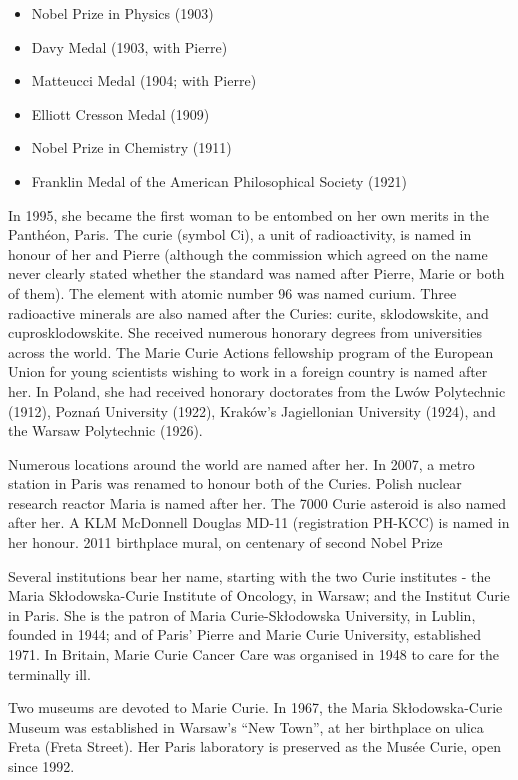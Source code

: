 \documentclass[12pt,a4paper]{article}
\begin{document}
\begin{itemize}
\item{Nobel Prize in Physics (1903)}
\item{Davy Medal (1903, with Pierre)}
\item{Matteucci Medal (1904; with Pierre)}
\item{Elliott Cresson Medal (1909)}
\item{Nobel Prize in Chemistry (1911)}
\item{Franklin Medal of the American Philosophical Society (1921)}
\end{itemize}

In 1995, she became the first woman to be entombed on her own merits in the Panth\'eon, Paris. The curie (symbol Ci), a unit of radioactivity, is named in honour of her and Pierre (although the commission which agreed on the name never clearly stated whether the standard was named after Pierre, Marie or both of them). The element with atomic number 96 was named curium. Three radioactive minerals are also named after the Curies: curite, sklodowskite, and cuprosklodowskite. She received numerous honorary degrees from universities across the world. The Marie Curie Actions fellowship program of the European Union for young scientists wishing to work in a foreign country is named after her. In Poland, she had received honorary doctorates from the Lw\'ow Polytechnic (1912), Pozna\'n University (1922), Krak\'ow's Jagiellonian University (1924), and the Warsaw Polytechnic (1926).

Numerous locations around the world are named after her. In 2007, a metro station in Paris was renamed to honour both of the Curies. Polish nuclear research reactor Maria is named after her. The 7000 Curie asteroid is also named after her. A KLM McDonnell Douglas MD-11 (registration PH-KCC) is named in her honour.
2011 birthplace mural, on centenary of second Nobel Prize

Several institutions bear her name, starting with the two Curie institutes - the Maria Sk\l{}odowska-Curie Institute of Oncology, in Warsaw; and the Institut Curie in Paris. She is the patron of Maria Curie-Sk\l{}odowska University, in Lublin, founded in 1944; and of Paris' Pierre and Marie Curie University, established 1971. In Britain, Marie Curie Cancer Care was organised in 1948 to care for the terminally ill.

Two museums are devoted to Marie Curie. In 1967, the Maria Sk\l{}odowska-Curie Museum was established in Warsaw's ``New Town'', at her birthplace on ulica Freta (Freta Street). Her Paris laboratory is preserved as the Mus\'ee Curie, open since 1992.
\end{document}

